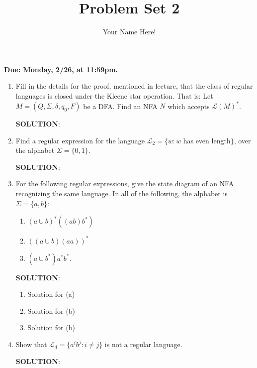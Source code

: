 \documentclass[12pt]{article}
\title{Problem Set 2}
\author{Your Name Here!}
\date{}
\newcommand{\sol}{\par{\bf SOLUTION}: }
\begin{document}
\maketitle

\noindent
    {\bf Due: Monday, 2/26, at 11:59pm. }
    
\begin{enumerate}
\item Fill in the details for the proof, mentioned in lecture, that the class of regular languages is closed under the Kleene star operation. That is: Let $M = (Q, \Sigma, \delta, q_0, F)$ be a DFA. Find an NFA $N$ which accepts $\mathcal{L}(M)^*$.
\sol %

    
\item Find a regular expression for the language $\mathcal{L}_2 = \{ w: w$ has even length$\}$, over the alphabet $\Sigma = \{ 0, 1 \}$.
\sol %

\item For the following regular expressions, give the state diagram of an NFA recognizing the same language. In all of the following, the alphabet is $\Sigma = \{ a, b \}$:  
\begin{enumerate}
	\item $(a \cup b)^* ((ab)b^* )$  
	\item $((a \cup b)(aa))^*$  
	\item $(a \cup b^*)a^*b^*$.  
\end{enumerate}

\sol %
\begin{enumerate}
	\item Solution for (a)
	\item Solution for (b)
	\item Solution for (b)
\end{enumerate}

\item Show that $\mathcal{L}_4 = \{ a^i b^j : i \neq j \}$ is not a regular language.

\sol %








\end{enumerate}
\end{document}

